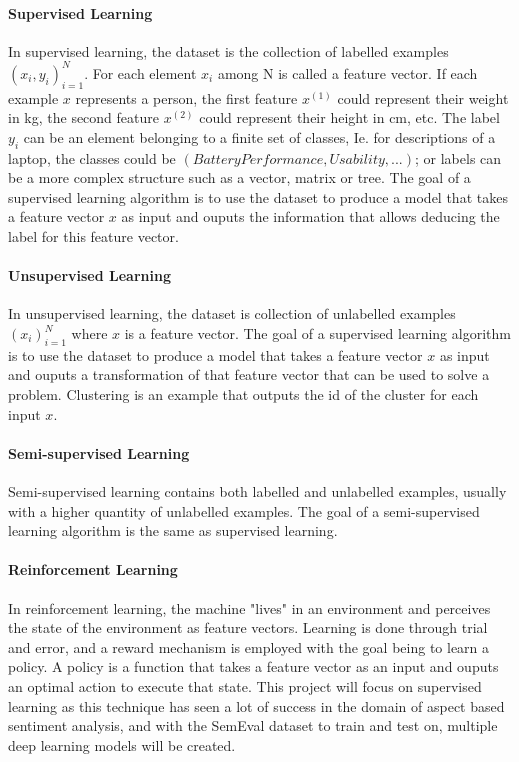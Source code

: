 \documentclass[11pt]{article}
\begin{document}
\paragraph{Supervised Learning}
In supervised learning, the dataset is the collection of labelled examples ${(x_i,y_i )_{i=1}^N}$. For each element $x_i$ among N is called a feature vector. If each example $x$ represents a person, the first feature $x^{(1)}$ could represent their weight in kg, the second feature $x^{(2)}$ could represent their height in cm, etc. The label $y_i$ can be an element belonging to a finite set of classes, Ie. for descriptions of a laptop, the classes could be ${(Battery Performance, Usability, ...)}$; or labels can be a more complex structure such as a vector, matrix or tree.  
The goal of a supervised learning algorithm is to use the dataset to produce a model that takes a feature vector $x$ as input and ouputs the information that allows deducing the label for this feature vector. 
\paragraph{Unsupervised Learning}
In unsupervised learning, the dataset is collection of unlabelled examples ${(x_i)_{i=1}^N}$ where $x$ is a feature vector. 
The goal of a supervised learning algorithm is to use the dataset to produce a model that takes a feature vector $x$ as input and ouputs a transformation of that feature vector that can be used to solve a problem. Clustering is an example that outputs the id of the cluster for each input ${x}$.
\paragraph{Semi-supervised Learning}
Semi-supervised learning contains both labelled and unlabelled examples, usually with a higher quantity of unlabelled examples. 
The goal of a semi-supervised learning algorithm is the same as supervised learning. 
\paragraph{Reinforcement Learning}
In reinforcement learning, the machine "lives" in an environment and perceives the state of the environment as feature vectors. Learning is done through trial and error, and a reward mechanism is employed with the goal being to learn a policy. A policy is a function that takes a feature vector as an input and ouputs an optimal action to execute that state. 
\newline\newline
This project will focus on supervised learning as this technique has seen a lot of success in the domain of aspect based sentiment analysis, and with the SemEval dataset to train and test on, multiple deep learning models will be created.
\end{document}
